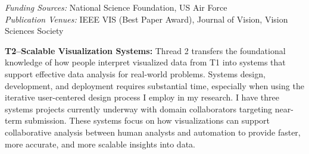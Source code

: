 \documentclass[11pt]{article}
\begin{document}


\emph{Funding Sources:} National Science Foundation, US Air Force\\
\emph{Publication Venues:} IEEE VIS (Best Paper Award), Journal of Vision, Vision Sciences Society

\textbf{T2--Scalable Visualization Systems: }
Thread 2 transfers the foundational knowledge of how people interpret visualized data from T1 into systems that support effective data analysis for real-world problems. 
Systems design, development, and deployment requires substantial time, especially when using the iterative user-centered design process I employ in my research. I have three systems projects currently underway with domain collaborators targeting near-term submission. These systems focus on how visualizations can support collaborative analysis between human analysts and automation to provide faster, more accurate, and more scalable insights into data.
\end{document}

